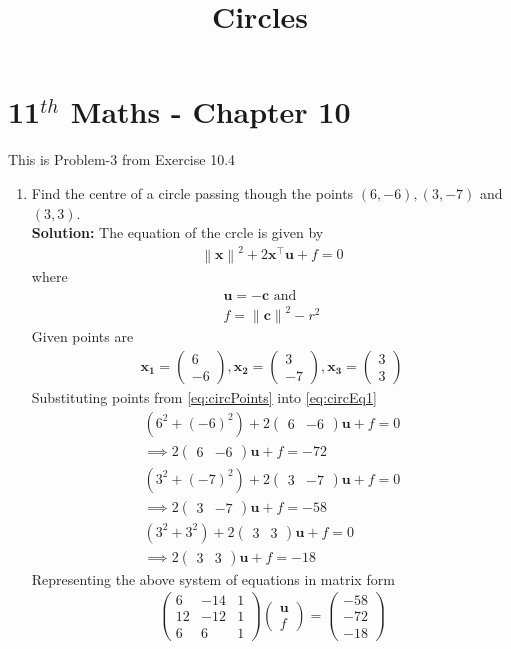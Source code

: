 \documentclass[12pt]{article}
\providecommand{\brak}[1]{\ensuremath{\left(#1\right)}}
\providecommand{\norm}[1]{\left\lVert#1\right\rVert}
\newcommand{\solution}{\noindent \textbf{Solution: }}
\newcommand{\myvec}[1]{\ensuremath{\begin{pmatrix}#1\end{pmatrix}}}
\let\vec\mathbf
\begin{document}
\begin{center}
\title{\textbf{Circles}}
\date{\vspace{-5ex}} %
\maketitle
\end{center}
\setcounter{page}{1}

\section{11$^{th}$ Maths - Chapter 10}
This is Problem-3 from Exercise 10.4
\begin{enumerate}
\item Find the centre of a circle passing though the points $(6,-6), (3,-7)$ and $(3,3)$. \\ 
\solution 
The equation of the crcle is given by 
\begin{align}
	\label{eq:circEq1}
	\norm{\vec{x}}^2+2\vec{x}^\top\vec{u}+f = 0 
\end{align}
where
\begin{align}
	\vec{u} = -\vec{c} \text{ and } \\
        \label{eq:fRelation}
	f = \norm{\vec{c}}^2 - r^2
\end{align}
Given points are 
\begin{align}
	\label{eq:circPoints}
     \vec{x_1} = \myvec{6 \\ -6} , \vec{x_2} = \myvec{3 \\-7}, \vec{x_3}= \myvec{3 \\ 3}
\end{align}
Substituting points from \eqref{eq:circPoints} into \eqref{eq:circEq1}
\begin{align}
	\brak{6^2 + \brak{-6}^2}+2\myvec{6 & -6}\vec{u}+f = 0 \\ 
	\implies 2\myvec{6 & -6}\vec{u} + f = -72 \\ 
	\brak{3^2 + \brak{-7}^2}+2\myvec{3 & -7}\vec{u}+f = 0 \\ 
	\implies 2\myvec{3 & -7}\vec{u} + f = -58 \\
	\brak{3^2 + 3^2}+2\myvec{3 & 3}\vec{u}+f = 0 \\ 
	\implies 2\myvec{3 & 3}\vec{u} + f = -18 
\end{align}
Representing the above system of equations in matrix form
\begin{align}
 \myvec{6 & -14 & 1 \\
	12 & -12 & 1 \\
	6 & 6 & 1
	} \myvec {\vec{u} \\
	           f 
		}  = \myvec{-58 \\ -72 \\ -18 }
\end{align}


\end{enumerate}
\end{document}
